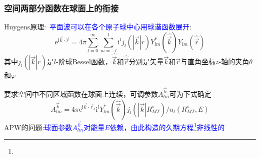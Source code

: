 \frame
{
	\frametitle{空间两部分函数在球面上的衔接}
	\textrm{Huygens}原理:~\textcolor{blue}{平面波可以在各个原子球中心用球谐函数展开}:
	\begin{displaymath}
		\mathrm{e}^{\mathrm{i}\vec k\cdot\vec r}=4\pi\sum_{l=0}^{\infty}\sum_{m=-l}^l\mathrm{i}^lj_l(|\vec k|r)Y_{lm}^{\ast}(\hat{\vec k})Y_{lm}(\hat{\vec r})
	\end{displaymath}
	其中$j_l(|\vec k|r)$是$l$-阶球\textrm{Bessel}函数，$\hat{\vec k}$和$\hat{\vec r}$分别是矢量$\vec k$和$\vec r$与直角坐标$z$-轴的夹角$\theta$和$\varphi$

	要求空间中不同区域函数在球面上连续，可调参数$A_{lm}^{\vec k}$可为下式确定
\begin{displaymath}
	A_{lm}^{\vec k}=4\pi\mathrm{e}^{\mathrm{i}\vec k\cdot\vec r_s}\mathrm{i}^lY_{lm}^{\ast}(\hat{\vec k})j_l(|\vec k|R_{MT}^s)/u_l(R_{MT}^s,E)
\end{displaymath}
\textrm{APW}的问题:\textcolor{blue}{球面参数$A_{lm}^{\vec k}$对能量$E$依赖，由此构造的久期方程\footnote{\fontsize{7.2pt}{6.2pt}}非线性的}
}

